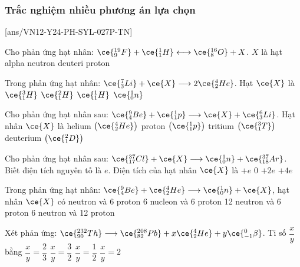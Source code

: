 \subsubsection{Trắc nghiệm nhiều phương án lựa chọn}
\setcounter{ex}{0}
[ans/VN12-Y24-PH-SYL-027P-TN]
\begin{ex}
	Cho phản ứng hạt nhân: $\ce{^{19}_9F}+\ce{^1_1H}\longleftrightarrow\ce{^{16}_8O}+X$. $X$ là hạt	
	\choice
	{\True alpha}
	{neutron}
	{deuteri}
	{proton}
	\loigiai{}
\end{ex}
\begin{ex}
	Trong phản ứng hạt nhân: $\ce{^7_3Li}+\ce{X}\longrightarrow2\ce{^4_2He}$. Hạt $\ce{X}$ là
	\choice
	{$\ce{^3_1H}$}
	{$\ce{^2_1H}$}
	{\True $\ce{^1_1H}$}
	{$\ce{^1_0n}$}
	\loigiai{}
\end{ex}
\begin{ex}
	Cho phản ứng hạt nhân sau: $\ce{_4^9Be}+\ce{^1_1p} \longrightarrow \ce{X}+\ce{_3^6Li}$. Hạt nhân $\ce{X}$ là
	\choice
	{\True helium $\left(\ce{^4_2He}\right)$}
	{proton $\left(\ce{^1_1p}\right)$}
	{tritium $\left(\ce{^3_1T}\right)$}
	{deuterium $\left(\ce{^2_1D}\right)$}
	\loigiai{}
\end{ex}
\begin{ex}
	Cho phản ứng hạt nhân sau: $\ce{_{17}^{37}Cl}+\ce{X} \longrightarrow \ce{_0^1n}+\ce{_{18}^{37}Ar}$. Biết điện tích nguyên tố là $e$. Điện tích của hạt nhân $\ce{X}$ là
	\choice
	{\True $+e$}
	{$0$}
	{$+2e$}
	{$+4e$}
	\loigiai{}
\end{ex}
\begin{ex}
	Trong phản ứng hạt nhân: $\ce{_4^9Be}+\ce{_2^4He} \longrightarrow \ce{_0^1n}+\ce{X}$, hạt nhân $\ce{X}$ có	
	\choice
	{ neutron và 6 proton}
	{6 nucleon và 6 proton}
	{12 neutron và 6 proton}
	{6 neutron và 12 proton}
	\loigiai{}
\end{ex}
\begin{ex}
	Xét phản ứng: $\ce{_{90}^{232}Th} \longrightarrow \ce{_{82}^{208}Pb}+x \ce{_2^4He}+y \ce{_{-1}^0\beta}$. Ti số $\dfrac{x}{y}$ bằng
	\choice
	{$\dfrac{x}{y}=\dfrac{2}{3}$}
	{\True $\dfrac{x}{y}=\dfrac{3}{2}$}
	{$\dfrac{x}{y}=\dfrac{1}{2}$}
	{$\dfrac{x}{y}=2$}
\end{ex}
